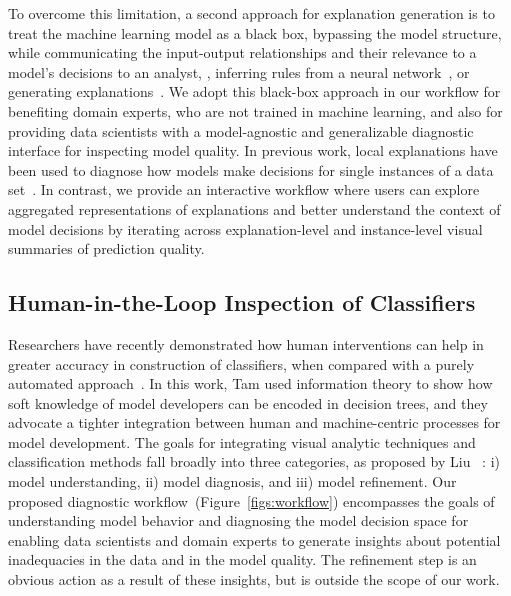 To overcome this limitation, a second approach for explanation generation is to treat the machine learning model as a black box, bypassing the model structure, while communicating the input-output relationships and their relevance to a model's decisions to an analyst, \eg, inferring rules from a neural network~\cite{Craven98usingneural}, or generating explanations~\cite{DBLP:journals/corr/RibeiroSG16,prospector}. We adopt this black-box approach in our workflow for benefiting domain experts, who are not trained in machine learning, and also for providing data scientists with a model-agnostic and generalizable diagnostic interface for inspecting model quality. In previous work, local explanations have been used to diagnose how models make decisions for single instances of a data set~\cite{infuse,prospector,DBLP:journals/corr/RibeiroSG16}.
In contrast, we provide an interactive workflow where users can explore aggregated representations of explanations and better understand the context of model decisions by iterating across explanation-level and instance-level visual summaries of prediction quality.  











\subsection{Human-in-the-Loop Inspection of Classifiers}%

Researchers have recently demonstrated how human interventions can help in greater accuracy in construction of classifiers, when compared with a purely automated approach~\cite{tam2017analysis}. In this work, Tam \etal used information theory to show how soft knowledge of model developers can be encoded in decision trees, and they advocate a tighter integration between human and machine-centric processes for model development. The goals for integrating visual analytic techniques and classification methods fall broadly into three categories, as proposed by Liu \etal~\cite{liu2017towards}: i) model understanding, ii) model diagnosis, and iii) model refinement. Our proposed diagnostic workflow~(Figure~\ref{figs:workflow}) encompasses the goals of understanding model behavior and diagnosing the model decision space for enabling data scientists and domain experts to generate insights about potential inadequacies in the data and in the model quality. The refinement step is an obvious action as a result of these insights, but is outside the scope of our work.

